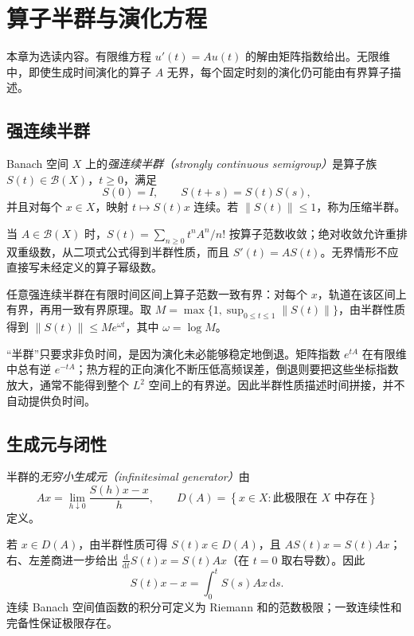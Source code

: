 \setcounter{chapter}{16} %
\chapter{算子半群与演化方程}
\label{chap:fa-semigroups}

本章为选读内容。有限维方程 $u'(t)=Au(t)$ 的解由矩阵指数给出。无限维中，即使生成时间演化的算子 $A$ 无界，每个固定时刻的演化仍可能由有界算子描述。

\section{强连续半群}
\begin{definition}
Banach 空间 $X$ 上的\emph{强连续半群（strongly continuous semigroup）}是算子族 $S(t)\in\mathcal B(X)$，$t\geq0$，满足
\[
 S(0)=I,\qquad S(t+s)=S(t)S(s),
\]
并且对每个 $x\in X$，映射 $t\mapsto S(t)x$ 连续。若 $\|S(t)\|\leq1$，称为压缩半群。
\end{definition}
当 $A\in\mathcal B(X)$ 时，$S(t)=\sum_{n\geq0}t^nA^n/n!$ 按算子范数收敛；绝对收敛允许重排双重级数，从二项式公式得到半群性质，而且 $S'(t)=AS(t)$。无界情形不应直接写未经定义的算子幂级数。

任意强连续半群在有限时间区间上算子范数一致有界：对每个 $x$，轨道在该区间上有界，再用一致有界原理。取 $M=\max\{1,\sup_{0\leq t\leq1}\|S(t)\|\}$，由半群性质得到 $\|S(t)\|\leq M e^{\omega t}$，其中 $\omega=\log M$。

“半群”只要求非负时间，是因为演化未必能够稳定地倒退。矩阵指数 $e^{tA}$ 在有限维中总有逆 $e^{-tA}$；热方程的正向演化不断压低高频误差，倒退则要把这些坐标指数放大，通常不能得到整个 $L^2$ 空间上的有界逆。因此半群性质描述时间拼接，并不自动提供负时间。

\section{生成元与闭性}
\begin{definition}
半群的\emph{无穷小生成元（infinitesimal generator）}由
\begin{equation}
 Ax=\lim_{h\downarrow0}\frac{S(h)x-x}{h},\qquad
 D(A)=\left\{x\in X:\text{此极限在 }X\text{ 中存在}\right\}
 \label{eq:fa-semigroup-generator}
\end{equation}
定义。
\end{definition}
若 $x\in D(A)$，由半群性质可得 $S(t)x\in D(A)$，且 $AS(t)x=S(t)Ax$；右、左差商进一步给出 $\frac{\mathrm d}{\mathrm dt}S(t)x=S(t)Ax$（在 $t=0$ 取右导数）。因此
\begin{equation}
 S(t)x-x=\int_0^tS(s)Ax\,\mathrm ds.
 \label{eq:fa-generator-integral}
\end{equation}
连续 Banach 空间值函数的积分可定义为 Riemann 和的范数极限；一致连续性和完备性保证极限存在。

